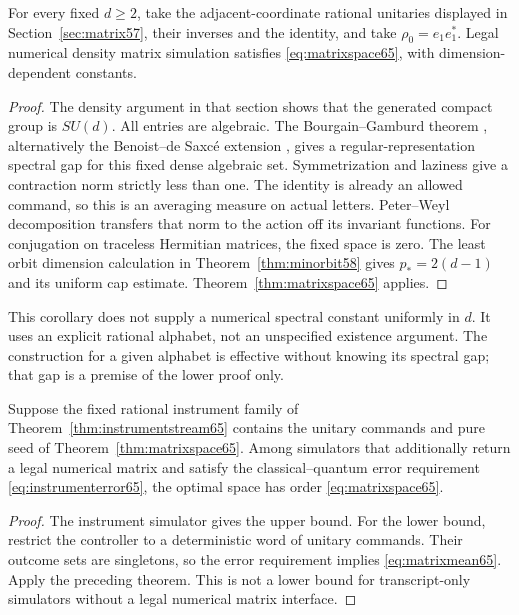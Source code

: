 \begin{corollary}
\label{cor:alldim65}
For every fixed $d\ge2$, take the adjacent-coordinate rational
unitaries displayed in Section~\ref{sec:matrix57}, their inverses and
the identity, and take $\rho_0=e_1e_1^*$. Legal numerical density
matrix simulation satisfies \eqref{eq:matrixspace65}, with
dimension-dependent constants.
\end{corollary}
\begin{proof}
The density argument in that section shows that the generated compact
group is $SU(d)$. All entries are algebraic. The
Bourgain--Gamburd theorem \cite{BG2012}, alternatively the
Benoist--de Saxc\'e extension \cite[Theorem~1.2]{BdS65}, gives a
regular-representation spectral gap for this fixed dense algebraic
set. Symmetrization and laziness give a contraction norm strictly
less than one. The identity is already an allowed command, so this
is an averaging measure on actual letters. Peter--Weyl decomposition
transfers that norm to the action off its invariant functions.
For conjugation on traceless Hermitian matrices, the fixed space
is zero. The least orbit dimension calculation in
Theorem~\ref{thm:minorbit58} gives $p_*=2(d-1)$ and its uniform
cap estimate. Theorem~\ref{thm:matrixspace65} applies.
\end{proof}
This corollary does not supply a numerical spectral constant uniformly
in $d$. It uses an explicit rational alphabet, not an unspecified
existence argument. The construction for a given alphabet is effective
without knowing its spectral gap; that gap is a premise of the lower
proof only.

\begin{corollary}
\label{cor:instrumentsharp65}
Suppose the fixed rational instrument family of
Theorem~\ref{thm:instrumentstream65} contains the unitary commands
and pure seed of Theorem~\ref{thm:matrixspace65}. Among simulators
that additionally return a legal numerical matrix and satisfy the
classical--quantum error requirement \eqref{eq:instrumenterror65},
the optimal space has order \eqref{eq:matrixspace65}.
\end{corollary}
\begin{proof}
The instrument simulator gives the upper bound. For the lower bound,
restrict the controller to a deterministic word of unitary commands.
Their outcome sets are singletons, so the error requirement implies
\eqref{eq:matrixmean65}. Apply the preceding theorem. This is not a
lower bound for transcript-only simulators without a legal numerical
matrix interface.
\end{proof}
